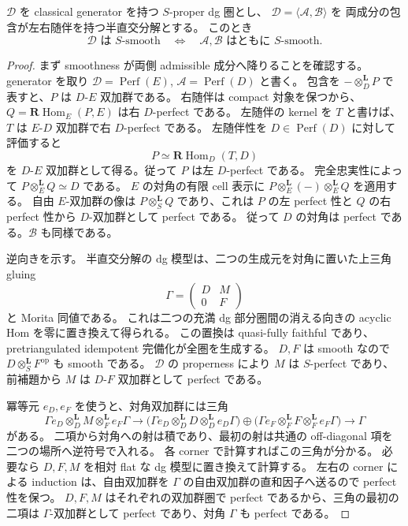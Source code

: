 \begin{lemma}
\label{lem:relative-finite-gluing-smoothness}
$\mathcal D$ を classical generator を持つ $S$-proper dg 圏とし、
$\mathcal D=\langle\mathcal A,\mathcal B\rangle$ を
両成分の包含が左右随伴を持つ半直交分解とする。
このとき
\[
 \mathcal D\text{ は }S\text{-smooth}
 \quad\Longleftrightarrow\quad
 \mathcal A,\mathcal B\text{ はともに }S\text{-smooth}.
\]
\end{lemma}
\begin{proof}
まず smoothness が両側 admissible 成分へ降りることを確認する。
generator を取り $\mathcal D=\operatorname{Perf}(E)$,
$\mathcal A=\operatorname{Perf}(D)$ と書く。
包含を $-\otimes_D^{\mathbf L}P$ で表すと、$P$ は $D$-$E$ 双加群である。
右随伴は compact 対象を保つから、
$Q=\mathbf R\operatorname{Hom}_E(P,E)$ は右 $D$-perfect である。
左随伴の kernel を $T$ と書けば、$T$ は $E$-$D$ 双加群で右 $D$-perfect である。
左随伴性を $D\in\operatorname{Perf}(D)$ に対して評価すると
\[
 P\simeq\mathbf R\operatorname{Hom}_D(T,D)
\]
を $D$-$E$ 双加群として得る。従って $P$ は左 $D$-perfect である。
完全忠実性によって $P\otimes_E^{\mathbf L}Q\simeq D$ である。
$E$ の対角の有限 cell 表示に
$P\otimes_E^{\mathbf L}(-)\otimes_E^{\mathbf L}Q$ を適用する。
自由 $E$-双加群の像は $P\otimes_S^{\mathbf L}Q$ であり、これは
$P$ の左 perfect 性と $Q$ の右 perfect 性から $D$-双加群として perfect である。
従って $D$ の対角は perfect である。$\mathcal B$ も同様である。

逆向きを示す。
半直交分解の dg 模型は、二つの生成元を対角に置いた上三角 gluing
\[
 \Gamma=\begin{pmatrix}D&M\\0&F\end{pmatrix}
\]
と Morita 同値である。
これは二つの充満 dg 部分圏間の消える向きの acyclic Hom を零に置き換えて得られる。
この置換は quasi-fully faithful であり、pretriangulated idempotent 完備化が全圏を生成する。
$D,F$ は smooth なので $D\otimes_S^{\mathbf L}F^{\mathrm{op}}$ も smooth である。
$\mathcal D$ の properness により $M$ は $S$-perfect であり、
前補題から $M$ は $D$-$F$ 双加群として perfect である。

冪等元 $e_D,e_F$ を使うと、対角双加群には三角
\[
 \Gamma e_D\otimes_D^{\mathbf L}M\otimes_F^{\mathbf L}e_F\Gamma
 \longrightarrow
 \bigl(\Gamma e_D\otimes_D^{\mathbf L}D\otimes_D^{\mathbf L}e_D\Gamma\bigr)
 \oplus
 \bigl(\Gamma e_F\otimes_F^{\mathbf L}F\otimes_F^{\mathbf L}e_F\Gamma\bigr)
 \longrightarrow\Gamma
\]
がある。
二項から対角への射は積であり、最初の射は共通の off-diagonal 項を
二つの場所へ逆符号で入れる。
各 corner で計算すればこの三角が分かる。
必要なら $D,F,M$ を相対 flat な dg 模型に置き換えて計算する。
左右の corner による induction は、自由双加群を
$\Gamma$ の自由双加群の直和因子へ送るので perfect 性を保つ。
$D,F,M$ はそれぞれの双加群圏で perfect であるから、三角の最初の二項は
$\Gamma$-双加群として perfect であり、対角 $\Gamma$ も perfect である。
\end{proof}

